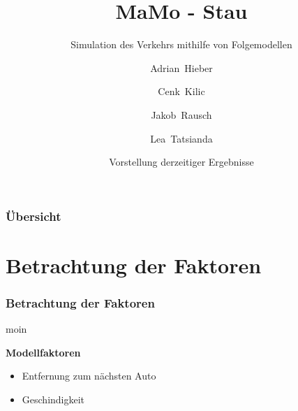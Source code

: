 \documentclass{beamer}
\title[MaMo - Stau] %
{MaMo - Stau}
\subtitle{Simulation des Verkehrs mithilfe von Folgemodellen}
\author[Hieber, Kilic, Rausch, Tatsianda] %
{Adrian~Hieber \and Cenk~Kilic \and Jakob~Rausch \and Lea~Tatsianda}
\date[\today] %
{Vorstellung derzeitiger Ergebnisse}
\begin{document}
\frame{\titlepage}


\begin{frame}
\frametitle{Übersicht}
\tableofcontents
\end{frame}


\section{Betrachtung der Faktoren}

\begin{frame}
\frametitle{Betrachtung der Faktoren}
moin


\textbf{Modellfaktoren}
\begin{itemize}
    \item<2-> Entfernung zum nächsten Auto
    \item<2-> Geschindigkeit
\end{itemize}

\end{frame}



\end{document}

